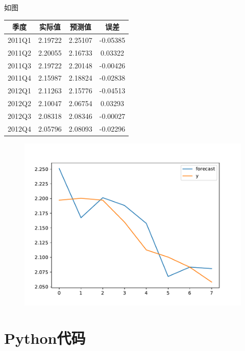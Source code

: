 \documentclass[cn]{homework}
\begin{document}
\begin{subproblem}[(\alph*)]
        \item
        如图
        \begin{table}[h]
            \centering
            \begin{tabular}{cccc}
                \toprule
                季度 & 实际值 & 预测值 & 误差\\
                \midrule
                2011Q1 & 2.19722 & 2.25107 & -0.05385\\
                2011Q2 & 2.20055 & 2.16733 & 0.03322\\
                2011Q3 & 2.19722 & 2.20148 & -0.00426\\
                2011Q4 & 2.15987 & 2.18824 & -0.02838\\
                2012Q1 & 2.11263 & 2.15776 & -0.04513\\
                2012Q2 & 2.10047 & 2.06754 & 0.03293\\
                2012Q3 & 2.08318 & 2.08346 & -0.00027\\
                2012Q4 & 2.05796 & 2.08093 & -0.02296\\
                \bottomrule
            \end{tabular}
        \end{table}
        \begin{figure}
            \centering
            \includegraphics[width=0.8\linewidth]{tail-prediction}
        \end{figure}
    \end{subproblem}

    \newpage
    \appendix
    \section{Python代码}
    
\end{document}
